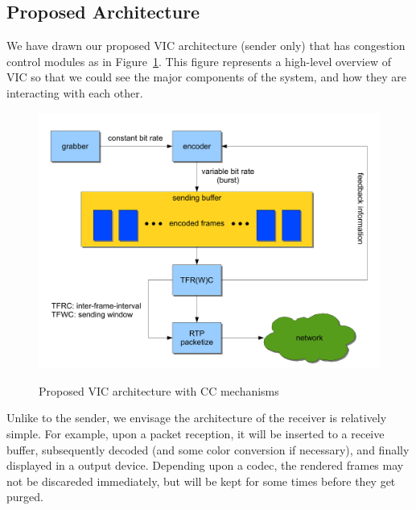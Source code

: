 \newpage

\subsection{\label{ssec:proposed-arch}Proposed Architecture}

We have drawn our proposed VIC architecture (sender only) that has congestion
control modules as in Figure~\ref{fig:proposed-arch}. This figure represents a
high-level overview of VIC so that we could see the major components of the
system, and how they are interacting with each other. 

\vspace{1cm}

\begin{figure}[!h]
\begin{center}
\includegraphics[scale=.5]{./img/proposed-vic-arch}
\label{fig:proposed-arch}
\caption{Proposed VIC architecture with CC mechanisms}
\end{center}
\end{figure}

Unlike to the sender, we envisage the architecture of the receiver is relatively
simple. For example, upon a packet reception, it will be inserted to a receive
buffer, subsequently decoded (and some color conversion if necessary), and
finally displayed in a output device. Depending upon a codec, the rendered
frames may not be discareded immediately, but will be kept for some times before
they get purged.

\newpage

